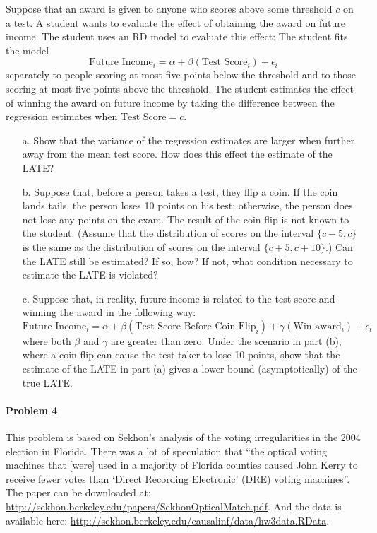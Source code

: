 \documentclass{article}
\begin{document}
    Suppose that an award is given to anyone who scores above some threshold $c$ on a test.
    A student wants to evaluate the effect of obtaining the award on future income.
    The student uses an RD model to evaluate this effect:
    The student fits the model
    $$
      \text{Future Income}_i = \alpha + \beta(\text{Test Score}_i) + \epsilon_i
    $$
    separately to people scoring at most five points below the threshold  
    and to those scoring at most five points above the threshold.
    The student estimates the effect of winning the award on future income by 
    taking the difference between the 
    regression estimates
    when $\text{Test Score} = c$.
  \begin{itemize}
    \item[a.] Show that the variance of the regression estimates 
      are larger when further away from the mean test score.  
      How does this effect the estimate of the LATE?   
    \item[b.] Suppose that, before a person takes a test, they flip a coin.
      If the coin lands tails, the person loses 10 points on his test; otherwise, the person 
      does not lose any points on the exam. 
      The result of the coin flip is not known to the student. (Assume that the distribution of scores on the interval $\{c-5,c\}$ is the same as the distribution of scores on the interval $\{c+5,c+10\}$.)
      Can the LATE still be estimated?  
      If so, how?
      If not, what condition necessary to estimate the LATE is violated?
    \item[c.] Suppose that, in reality, future income is related to the test score and winning the award
    in the following way: 
    $$
       \text{Future Income}_i = \alpha + \beta(\text{Test Score Before Coin Flip}_i) 
         + \gamma(\text{Win award}_i) + \epsilon_i
    $$
    where both $\beta$ and $\gamma$ are greater than zero.
    Under the scenario in part (b), where a coin flip can cause the test taker to lose 10 points,
    show that the estimate of the LATE in part (a) gives a lower bound
    (asymptotically) of the true
    LATE.
\end{itemize}


\paragraph{Problem 4}

This problem is based on Sekhon's analysis of the voting
irregularities in the 2004 election in Florida. There was a lot of
speculation that ``the optical voting machines that [were] used in a
majority of Florida counties caused John Kerry to receive fewer votes
than `Direct Recording Electronic' (DRE) voting machines''. The paper
can be downloaded at:
\url{http://sekhon.berkeley.edu/papers/SekhonOpticalMatch.pdf}.  And
the data is available here:
\url{http://sekhon.berkeley.edu/causalinf/data/hw3data.RData}.
\end{document}
